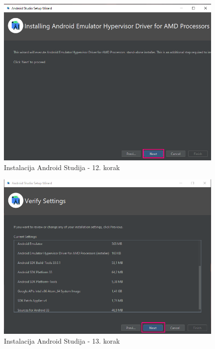 \documentclass[11pt,a4paper,twoside]{article}
\begin{document}
\begin{figure}[!h]
	\centering
	\includegraphics[width=\textwidth]{install_12.png}
	\caption{Instalacija Android Studija - 12. korak}
	\label{fig:install_12}	
\end{figure}

\begin{figure}[!h]
	\centering
	\includegraphics[width=\textwidth]{install_13.png}
	\caption{Instalacija Android Studija - 13. korak}
	\label{fig:install_13}	
\end{figure}
\end{document}
